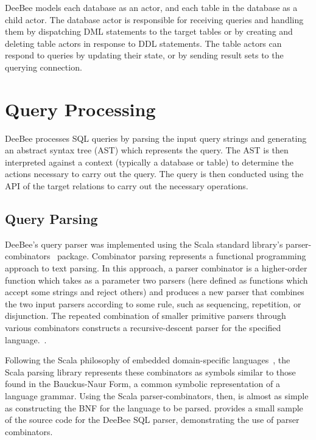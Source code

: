 DeeBee models each database as an actor, and each table in the database as a child actor. The database actor is responsible for receiving queries and handling them by dispatching DML statements to the target tables or by creating and deleting table actors in response to DDL statements. The table actors can respond to queries by updating their state, or by sending result sets to the querying connection.

\section{Query Processing}

DeeBee processes SQL queries by parsing the input query strings and generating an abstract syntax tree (AST) which represents the query. The AST is then interpreted against a context (typically a database or table) to determine the actions necessary to carry out the query. The query is then conducted using the API of the target relations to carry out the necessary operations.

\subsection{Query Parsing}
\label{sec:parsing}

DeeBee's query parser was implemented using the Scala standard library's parser-combinators~\cite{moors2008parser} package. Combinator parsing represents a functional programming approach to text parsing. In this approach, a parser combinator is a higher-order function which takes as a parameter two parsers (here defined as functions which accept some strings and reject others) and produces a new parser that combines the two input parsers according to some rule, such as sequencing, repetition, or disjunction. The repeated combination of smaller primitive parsers through various combinators constructs a recursive-descent parser for the specified language.~\cite{moors2008parser,swierstra2001combinator,fokker1995functional,frost2008parser}.

Following the Scala philosophy of embedded domain-specific languages~\cite{ghosh2010dsls,hofer2008polymorphic,moors2008parser}, the Scala parsing library represents these combinators as symbols similar to those found in the Bauckus-Naur Form, a common symbolic representation of a language grammar. Using the Scala parser-combinators, then, is almost as simple as constructing the BNF for the language to be parsed.  provides a small sample of the source code for the DeeBee SQL parser, demonstrating the use of parser combinators. 

